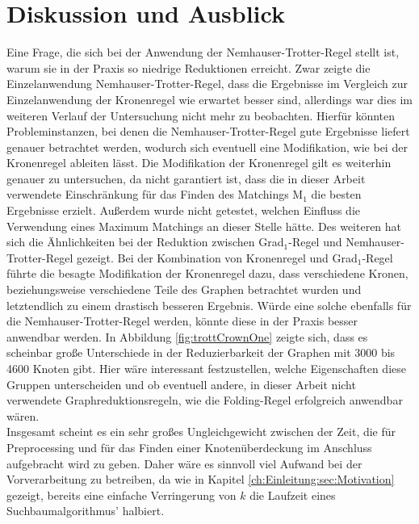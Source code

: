 
\chapter{Diskussion und Ausblick}
\label{ch:fazit}

Eine Frage, die sich bei der Anwendung der Nemhauser-Trotter-Regel stellt ist, warum sie in der Praxis so niedrige Reduktionen erreicht. Zwar zeigte die Einzelanwendung Nemhauser-Trotter-Regel, dass die Ergebnisse im Vergleich zur Einzelanwendung der Kronenregel wie erwartet besser sind, allerdings war dies im weiteren Verlauf der Untersuchung nicht mehr zu beobachten. Hierfür könnten Probleminstanzen, bei denen die Nemhauser-Trotter-Regel gute Ergebnisse liefert genauer betrachtet werden, wodurch sich eventuell eine Modifikation, wie bei der Kronenregel ableiten lässt. Die Modifikation der Kronenregel gilt es weiterhin genauer zu untersuchen, da nicht garantiert ist, dass die in dieser Arbeit verwendete Einschränkung für das Finden des Matchings M$_{1}$ die besten Ergebnisse erzielt. Außerdem wurde nicht getestet, welchen Einfluss die Verwendung eines Maximum Matchings an dieser Stelle hätte. Des weiteren hat sich die Ähnlichkeiten bei der Reduktion zwischen Grad$_{1}$-Regel und Nemhauser-Trotter-Regel gezeigt. Bei der Kombination von Kronenregel und Grad$_{1}$-Regel führte die besagte Modifikation der Kronenregel dazu, dass verschiedene Kronen, beziehungsweise verschiedene Teile des Graphen betrachtet wurden und letztendlich zu einem drastisch besseren Ergebnis. Würde eine solche ebenfalls für die Nemhauser-Trotter-Regel werden, könnte diese in der Praxis besser anwendbar werden.
In Abbildung \ref{fig:trottCrownOne} zeigte sich, dass es scheinbar große Unterschiede in der Reduzierbarkeit der Graphen mit 3000 bis 4600 Knoten gibt. Hier wäre interessant festzustellen, welche Eigenschaften diese Gruppen unterscheiden und ob eventuell andere, in dieser Arbeit nicht verwendete Graphreduktionsregeln, wie die Folding-Regel erfolgreich anwendbar wären.\\
Insgesamt scheint es ein sehr großes Ungleichgewicht zwischen der Zeit, die für Preprocessing und für das Finden einer Knotenüberdeckung im Anschluss aufgebracht wird zu geben. Daher wäre es sinnvoll viel Aufwand bei der Vorverarbeitung zu betreiben, da wie in Kapitel \ref{ch:Einleitung:sec:Motivation} gezeigt, bereits eine einfache Verringerung von $k$ die Laufzeit eines Suchbaumalgorithmus' halbiert.


